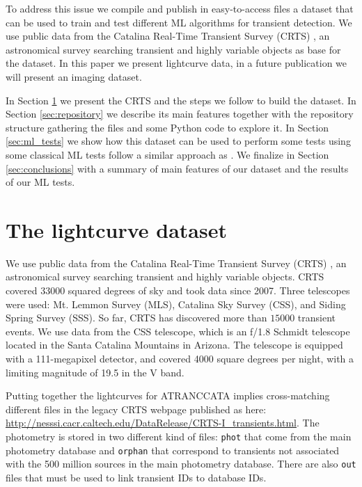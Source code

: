 \documentclass[a4paper,fleqn,usenatbib]{mnras}
\begin{document}
To address this issue we compile and publish in easy-to-access files a
dataset that can be used to train and test different ML algorithms for
transient detection.
We use public data from the Catalina Real-Time Transient Survey
(CRTS) \citep{1111.2566}, an astronomical survey searching transient
and highly variable objects as base for the dataset.
In this paper we present lightcurve data, in a future publication we
will present an imaging dataset. 

In Section \ref{sec:data} we present the CRTS and the steps we follow
to build the dataset.
In Section \ref{sec:repository} we describe its main features together
with the repository structure gathering the files and some Python code  
to explore it.
In Section \ref{sec:ml_tests} we show how this dataset can be used to
perform some tests using some classical ML tests follow a similar
approach as \cite{1601.03931}.  
We finalize in Section \ref{sec:conclusions} with a summary of main
features of our dataset and the results of our ML tests.

\section{The lightcurve dataset} 
\label{sec:data}

We use public data from the Catalina Real-Time Transient Survey
(CRTS) \citep{2009ApJ...696..870D}, an astronomical survey searching transient
and highly variable objects.   
CRTS covered 33000 squared degrees of sky and took data since 2007.
Three telescopes were used: Mt. Lemmon Survey (MLS), Catalina Sky
Survey (CSS), and Siding Spring Survey (SSS). So far, CRTS has
discovered more than $15000$ transient events.
We use data from the CSS telescope, which is an f/1.8 Schmidt
telescope located in the Santa Catalina Mountains in Arizona.
The telescope is equipped with a 111-megapixel  detector, and covered
4000 square degrees per night, with a limiting magnitude of 19.5 in
the V band.  

Putting together the lightcurves for ATRANCCATA implies
cross-matching different files in the legacy CRTS webpage
published as here:
\url{http://nesssi.cacr.caltech.edu/DataRelease/CRTS-I_transients.html}. 
The photometry is stored in two different kind of files: \verb"phot"
that come from the main photometry database and \verb"orphan" that
correspond to transients not associated with the 500 million sources
in the main photometry database.
There are also \verb"out" files that must be used to link transient
IDs to database IDs.
\end{document}
